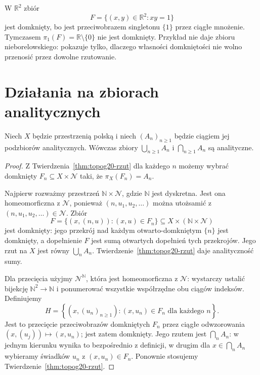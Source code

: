 \begin{przyklad}
\label{ex:topog20-rzut}
W \(\mathbb R^2\) zbiór
\[
 F=\{(x,y)\in\mathbb R^2:xy=1\}
\]
jest domknięty, bo jest
przeciwobrazem singletonu
\(\{1\}\) przez ciągłe
mnożenie. Tymczasem
\(\pi_1(F)=\mathbb R\setminus\{0\}\)
nie jest domknięty.
Przykład nie daje zbioru
nieborelowskiego: pokazuje tylko,
dlaczego własności domkniętości
nie wolno przenosić przez
dowolne rzutowanie.
\end{przyklad}

\section{Działania na zbiorach analitycznych}
\label{sec:topog20-operacje}

\begin{twierdzenie}
\label{thm:topog20-closure}
Niech \(X\) będzie przestrzenią polską
i niech \((A_n)_{n\ge1}\)
będzie ciągiem jej podzbiorów
analitycznych.
Wówczas zbiory
\(\bigcup_{n\ge1}A_n\) i
\(\bigcap_{n\ge1}A_n\)
są analityczne.
\end{twierdzenie}
\begin{proof}
Z Twierdzenia~\ref{thm:topog20-rzut}
dla każdego \(n\) możemy wybrać
domknięty \(F_n\subseteq
X\times\mathcal N\) taki,
że \(\pi_X(F_n)=A_n\).

Najpierw rozważmy przestrzeń
\(\mathbb N\times\mathcal N\),
gdzie \(\mathbb N\) jest dyskretna.
Jest ona homeomorficzna
z \(\mathcal N\), ponieważ
\((n,u_1,u_2,\ldots)\)
można utożsamić z
\((n,u_1,u_2,\ldots)\in\mathcal N\).
Zbiór
\[
 F=\{(x,(n,u)):
               (x,u)\in F_n\}
 \subseteq X\times(\mathbb N\times\mathcal N)
\]
jest domknięty: jego przekrój
nad każdym otwarto-domkniętym
\(\{n\}\) jest domknięty,
a dopełnienie \(F\) jest
sumą otwartych dopełnień
tych przekrojów.
Jego rzut na \(X\) jest
równy \(\bigcup_n A_n\).
Twierdzenie~\ref{thm:topog20-rzut}
daje analityczność sumy.

Dla przecięcia użyjmy
\(\mathcal N^{\mathbb N}\),
która jest homeomorficzna
z \(\mathcal N\): wystarczy
ustalić bijekcję
\(\mathbb N^2\to\mathbb N\)
i ponumerować wszystkie
współrzędne obu ciągów indeksów.
Definiujemy
\[
 H=\left\{(x,(u_n)_{n\ge1}):
            (x,u_n)\in F_n
            \text{ dla każdego }n\right\}.
\]
Jest to przecięcie
przeciwobrazów domkniętych \(F_n\)
przez ciągłe odwzorowania
\((x,(u_j))\mapsto(x,u_n)\);
jest zatem domknięty.
Jego rzutem jest
\(\bigcap_n A_n\):
w jednym kierunku wynika to
bezpośrednio z definicji,
w drugim dla \(x\in\bigcap_n A_n\)
wybieramy świadków \(u_n\)
z \((x,u_n)\in F_n\).
Ponownie stosujemy
Twierdzenie~\ref{thm:topog20-rzut}.
\end{proof}

